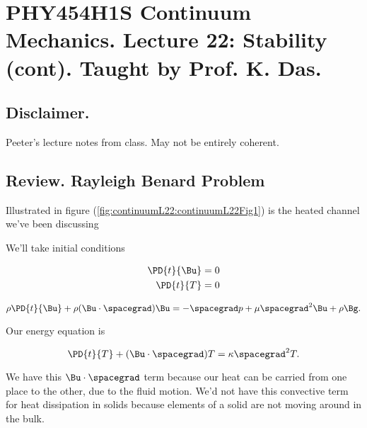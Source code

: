 
%

\chapter{PHY454H1S Continuum Mechanics.  Lecture 22: Stability (cont).  Taught by Prof. K. Das.}
\label{chap:continuumL22}
{}
\date{Apr 4, 2012}

\beginArtWithToc

\section{Disclaimer.}

Peeter's lecture notes from class.  May not be entirely coherent.

\section{Review.  Rayleigh Benard Problem}

Illustrated in figure (\ref{fig:continuumL22:continuumL22Fig1}) is the heated channel we've been discussing


We'll take initial conditions

\begin{align}\label{eqn:continuumL22:10}
\PD{t}{\Bu} &= 0 \\
\PD{t}{T} &= 0
\end{align}

\begin{equation}\label{eqn:continuumL22:30}
\rho \PD{t}{\Bu} + \rho (\Bu \cdot \spacegrad) \Bu = - \spacegrad p + \mu \spacegrad^2 \Bu + \rho \Bg.
\end{equation}

Our energy equation is

\begin{equation}\label{eqn:continuumL22:50}
\PD{t}{T} + (\Bu \cdot \spacegrad) T = \kappa \spacegrad^2 T.
\end{equation}

We have this $\Bu \cdot \spacegrad$ term because our heat can be carried from one place to the other, due to the fluid motion.  We'd not have this convective term for heat dissipation in solids because elements of a solid are not moving around in the bulk.

